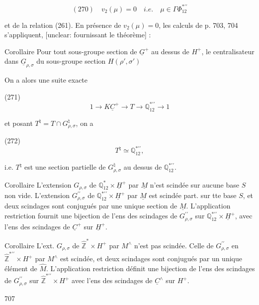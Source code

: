 $$ (270) \quad v_2(\mu) = 0 \quad i.e. \quad \mu \in \Gamma \Phi_{12}^{* \prime \prime} $$

et de la relation (261). En présence
de $v_2(\mu) = 0$, les calculs de p. 703, 704
s'appliquent, [unclear: fournissant le théorème] :

Corollaire Pour tout sous-groupe section de $\underline{G}^+$
au dessus de $H^+$, le centralisateur dans
$\underline{G}_{\rho,\sigma}$ du sous-groupe section $H(\rho',\sigma')$

\newpage


On a alors une suite exacte

(271) $$1 \to K \underline{C}^+ \to T \to \mathbb{Q}_{12}^{* \prime\prime} \to 1$$

et posant $T^{\natural} = T \cap G_{\rho, \sigma}^{\natural}$, on a

(272) $$T^{\natural} \simeq \mathbb{Q}_{12}^{* \prime\prime},$$

i.e. $T^{\natural}$ est une section partielle de
$G_{\rho, \sigma}^{\natural}$ au dessus de $\mathbb{Q}_{12}^{* \prime\prime}$.

Corollaire L'extension $G_{\rho, \sigma}$ de $\mathbb{Q}_{12}^* \times \underline{H}^+$
par $\underline{M}$ n'est scindée sur aucune base $S$
non vide. L'extension $G_{\rho, \sigma}^{\prime\prime}$ de $\mathbb{Q}_{12}^{* \prime\prime} \times \underline{H}^+$
par $\underline{M}$ est scindée part. sur tte base $S$,
et deux scindages sont conjugués par une
unique section de $\underline{M}$. L'application restriction
fournit une bijection de l'ens des
scindages de $G_{\rho, \sigma}^{\prime\prime}$ sur $\mathbb{Q}_{12}^{* \prime\prime} \times \underline{H}^+$, avec
l'ens des scindages de $\underline{C}^+$ sur $\underline{H}^+$.

Corollaire L'ext. $G_{\rho, \sigma}$ de $\hat{\mathbb{Z}}^* \times H^+$ par
$M^{\wedge}$ n'est pas scindée. Celle de $G_{\rho, \sigma}^{\prime\prime}$ en
$\hat{\mathbb{Z}}^{* \prime\prime} \times H^+$ par $M^{\wedge}$ est scindée, et deux
scindages sont conjugués par un unique
élément de $\hat{M}$. L'application restriction
définit une bijection de l'ens des
scindages de $G_{\rho, \sigma}^{\prime\prime}$ sur $\hat{\mathbb{Z}}^{* \prime\prime} \times H^+$ avec l'ens des
scindages de $\underline{C}^{\wedge}$ sur $H^+$.

\newpage


707

